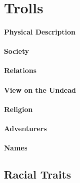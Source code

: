 \section{Trolls}
\paragraph{Physical Description}
\paragraph{Society}
\paragraph{Relations}
\paragraph{View on the Undead}
\paragraph{Religion}
\paragraph{Adventurers}
\paragraph{Names}

\subsection{Racial Traits}